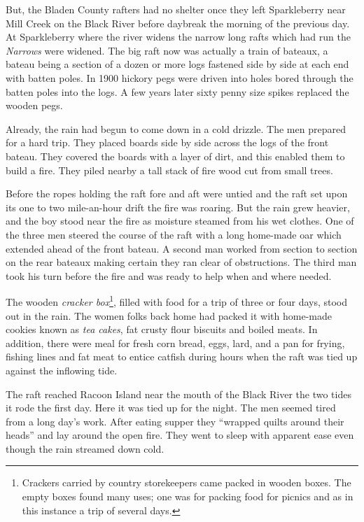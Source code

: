 \documentclass[11pt, a5paper, openright]{book}
\begin{document}
But, the Bladen County rafters had no shelter once they left
Sparkleberry near Mill Creek on the Black River before daybreak the
morning of the previous day.  At Sparkleberry where the river widens
the narrow long rafts which had run the \textit{Narrows} were widened.
The big raft now was actually a train of bateaux, a bateau being a
section of a dozen or more logs fastened side by side at each end with
batten poles.  In 1900 hickory pegs were driven into holes bored
through the batten poles into the logs.  A few years later sixty penny
size spikes replaced the wooden pegs.\par

Already, the rain had begun to come down in a cold drizzle.  The men
prepared for a hard trip.  They placed boards side by side across the
logs of the front bateau.  They covered the boards with a layer of
dirt, and this enabled them to build a fire.  They piled nearby a tall
stack of fire wood cut from small trees.\par

Before the ropes holding the raft fore and aft were untied and the
raft set upon its one to two mile-an-hour drift the fire was roaring.
But the rain grew heavier, and the boy stood near the fire as moisture
steamed from his wet clothes.  One of the three men steered the course
of the raft with a long home-made oar which extended ahead of the
front bateau.  A second man worked from section to section on the rear
bateaux making certain they ran clear of obstructions.  The third man
took his turn before the fire and was ready to help when and where
needed.\par

The wooden \textit{cracker box}\footnote{Crackers carried by country
  storekeepers came packed in wooden boxes.  The empty boxes found
  many uses; one was for packing food for picnics and as in this
  instance a trip of several days.}, filled with food for a trip of
three or four days, stood out in the rain.  The women folks back home
had packed it with home-made cookies known as \textit{tea cakes}, fat
crusty flour biscuits and boiled meats.  In addition, there were meal
for fresh corn bread, eggs, lard, and a pan for frying, fishing lines
and fat meat to entice catfish during hours when the raft was tied up
against the inflowing tide.\par

The raft reached Racoon Island near the mouth of the Black River the
two tides it rode the first day.  Here it was tied up for the night.
The men seemed tired from a long day's work.  After eating supper they
``wrapped quilts around their heads'' and lay around the open fire.
They went to sleep with apparent ease even though the rain streamed
down cold.\par
\end{document}
